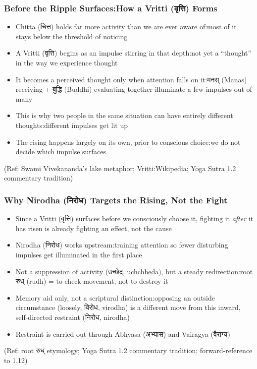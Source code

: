 \begin{frame}[fragile]\frametitle{Before the Ripple Surfaces:How a Vritti (वृत्ति) Forms}

\begin{itemize}
\item Chitta (चित्त) holds far more activity than we are ever aware of:most of it stays below the threshold of noticing
\item A Vritti (वृत्ति) begins as an impulse stirring in that depth:not yet a ``thought'' in the way we experience thought
\item It becomes a perceived thought only when attention falls on it:मनस् (Manas) receiving + बुद्धि (Buddhi) evaluating together illuminate a few impulses out of many
\item This is why two people in the same situation can have entirely different thoughts:different impulses get lit up
\item The rising happens largely on its own, prior to conscious choice:we do not decide which impulse surfaces
\end{itemize}

\tiny{(Ref: Swami Vivekananda's lake metaphor; Vritti:Wikipedia; Yoga Sutra 1.2 commentary tradition)}

\end{frame}

\begin{frame}[fragile]\frametitle{Why Nirodha (निरोध) Targets the Rising, Not the Fight}

\begin{itemize}
\item Since a Vritti (वृत्ति) surfaces before we consciously choose it, fighting it \emph{after} it has risen is already fighting an effect, not the cause
\item Nirodha (निरोध) works upstream:training attention so fewer disturbing impulses get illuminated in the first place
\item Not a suppression of activity (उच्छेद, uchchheda), but a steady redirection:root रुध् (rudh) = to check movement, not to destroy it
\item Memory aid only, not a scriptural distinction:opposing an outside circumstance (loosely, विरोध, virodha) is a different move from this inward, self-directed restraint (निरोध, nirodha)
\item Restraint is carried out through Abhyasa (अभ्यास) and Vairagya (वैराग्य)
\end{itemize}

\tiny{(Ref: root रुध् etymology; Yoga Sutra 1.2 commentary tradition; forward-reference to 1.12)}

\end{frame}

